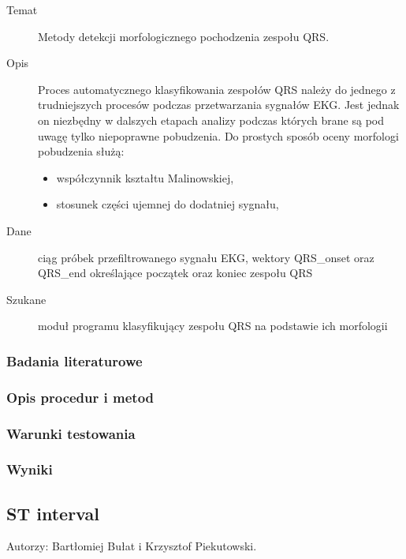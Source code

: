 \documentclass[a4paper, 11pt]{article}
\begin{document}
\begin{description}
\item[Temat] Metody detekcji morfologicznego pochodzenia zespołu QRS.
\item[Opis] Proces automatycznego klasyfikowania zespołów QRS należy do jednego z trudniejszych procesów podczas przetwarzania sygnałów EKG. Jest jednak on niezbędny w dalszych etapach analizy podczas których brane są pod uwagę tylko niepoprawne pobudzenia. Do prostych sposób oceny morfologi pobudzenia służą:
  \begin{itemize}
  \item współczynnik kształtu Malinowskiej,
  \item stosunek części ujemnej do dodatniej sygnału,
  \end{itemize}
\item[Dane] ciąg próbek przefiltrowanego sygnału EKG, wektory QRS\_onset oraz QRS\_end określające początek oraz koniec zespołu QRS
\item[Szukane] moduł programu klasyfikujący zespołu QRS na podstawie ich morfologii 
\end{description}

\subsubsection{Badania literaturowe}
\label{sec:qrs_class:papers}

\subsubsection{Opis procedur i metod}
\label{sec:qrs_class:procs}

\subsubsection{Warunki testowania}
\label{sec:qrs_class:tests}

\subsubsection{Wyniki}
\label{sec:qrs_class:results}



\subsection{ST interval}
\label{sec:st_interval}
Autorzy: Bartłomiej Bułat i Krzysztof Piekutowski.
\end{document}
